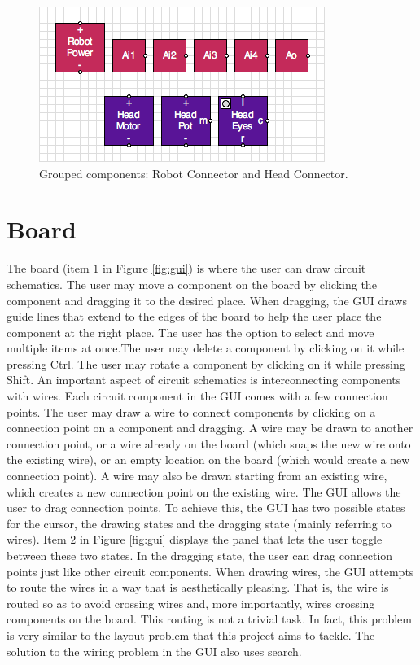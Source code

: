 \begin{figure}
\begin{center}
\includegraphics[scale=0.75]{Images/robot_head_parts.png}
\caption{Grouped components: Robot Connector and Head Connector.}
\label{fig:robot_head_parts}
\end{center}
\end{figure}

\section{Board}
\label{sec:board}

The board (item $1$ in Figure \ref{fig:gui}) is where the user can draw circuit
schematics. The user may move a component on the board by clicking the component
and dragging it to the desired place. When dragging, the GUI draws guide lines
that extend to the edges of the board to help the user place the component
at the right place. The user has the option to select and move multiple items at
once.The user may delete a component by clicking on it while
pressing Ctrl. The user may rotate a component by clicking on it
while pressing Shift. An important aspect of circuit schematics is
interconnecting components with wires. Each circuit component in the GUI comes
with a few connection points. The user may draw a wire to connect
components by clicking on a connection point on a component and dragging.
A wire may be drawn to another connection
point, or a wire already on the board (which snaps the new wire onto the
existing wire), or an empty location on the board (which would create a new
connection point). A wire may also be drawn starting from an existing wire,
which creates a new connection point on the existing wire. The GUI allows the
user to drag connection points. To achieve this, the GUI has two possible
states for the cursor, the drawing states and the dragging state (mainly
referring to wires). Item $2$ in Figure \ref{fig:gui} displays the panel that
lets the user toggle between these two states. In the dragging state, the user
can drag connection points just like other circuit components.
When drawing wires,
the GUI attempts to route the wires in a way that is aesthetically pleasing.
That is, the wire is routed so as to avoid crossing wires and, more importantly,
wires crossing components on the board. This routing is not a trivial
task. In fact, this problem is very similar to the layout problem that this
project aims to tackle. The solution to the wiring problem in the GUI also uses
search.

